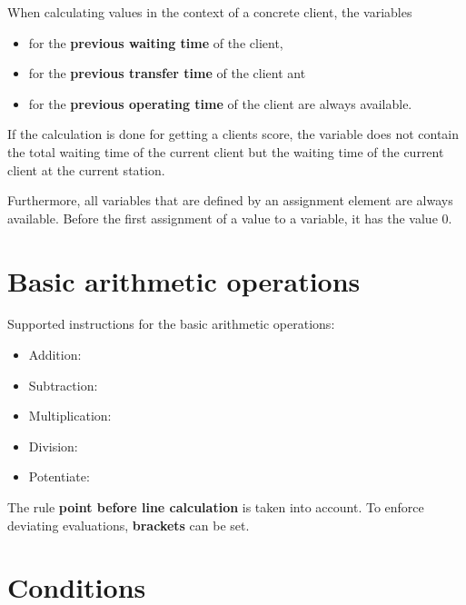 When calculating values in the context of a concrete client, the variables
\begin{itemize}
\item
{} for the \textbf{previous waiting time} of the client,
\item
{} for the \textbf{previous transfer time} of the client ant
\item
{} for the \textbf{previous operating time} of the client are always available.
\end{itemize}

If the calculation is done for getting a clients score, the variable  does not contain
the total waiting time of the current client but the waiting time of the current client at the
current station.

Furthermore, all variables that are defined by an assignment element are always available.
Before the first assignment of a value to a variable, it has the value 0.



\chapter{Basic arithmetic operations}

Supported instructions for the basic arithmetic operations:
\begin{itemize}
\item Addition: \cmd{$+$}
\item Subtraction: \cmd{$-$}
\item Multiplication: \cmd{$*$}
\item Division: \cmd{$/$}
\item Potentiate: \cmd{$\hat~$}
\end{itemize}

The rule \textbf{point before line calculation} is taken into account.
To enforce deviating evaluations, \textbf{brackets} can be set.



\chapter{Conditions}

